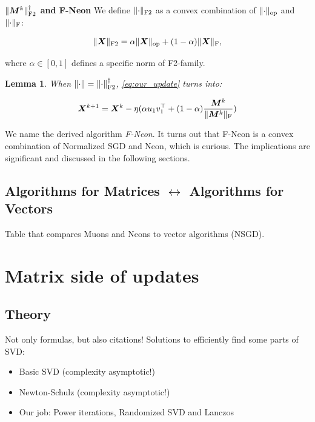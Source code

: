 \documentclass{article} %
\newtheorem{lemma}{Lemma}
\newcommand{\norm}[1]{\lVert #1\rVert}
\DeclarePairedDelimiter{\normf}{\|}{\|_\mathrm{F}}
\DeclarePairedDelimiter{\normftwo}{\|}{\|_\mathrm{F2}}
\DeclarePairedDelimiter{\norms}{\|}{\|_{\mathrm{op}}}
\begin{document}
    {\bf $\normftwo{\mM^{k}}^\dagger$ and F-Neon}
        We define $\normftwo{\cdot}$ as a convex combination of $\norms{\cdot}$ and $\normf{\cdot}$:

        \begin{equation}\label{eq:ftwo_norm}
            \normftwo{\mX} = \alpha \norms{\mX} + (1-\alpha)\normf{\mX},
        \end{equation}

        where $\alpha \in [0, 1]$ defines a specific norm of F2-family.

    \begin{lemma}\label{lemma:nsgd_neon_update}    
        When $\norm{\cdot} = \normftwo{\cdot}^\dagger$, \cref{eq:our_update} turns into:

        \begin{equation}\label{eq:nsgd_neon_update}
            \mX^{k+1} = \mX^{k} - \eta (\alpha u_1 v_1^\top + (1-\alpha)\frac{\mM^k}{\normf{\mM^k}})
        \end{equation}
    \end{lemma}

        We name the derived algorithm \emph{F-Neon}. It turns out that F-Neon is a convex combination of Normalized SGD and Neon, which is curious. The implications are significant and discussed in the following sections.



\subsection{Algorithms for Matrices $\leftrightarrow$ Algorithms for Vectors}
Table that compares Muons and Neons to vector algorithms (NSGD).


\section{Matrix side of updates}
    \subsection{Theory}
        Not only formulas, but also citations!
        Solutions to efficiently find some parts of SVD:
        \begin{itemize}
            \item Basic SVD (complexity asymptotic!)
            \item Newton-Schulz (complexity asymptotic!)
            \item Our job: Power iterations, Randomized SVD and Lanczos
        \end{itemize}
\end{document}
